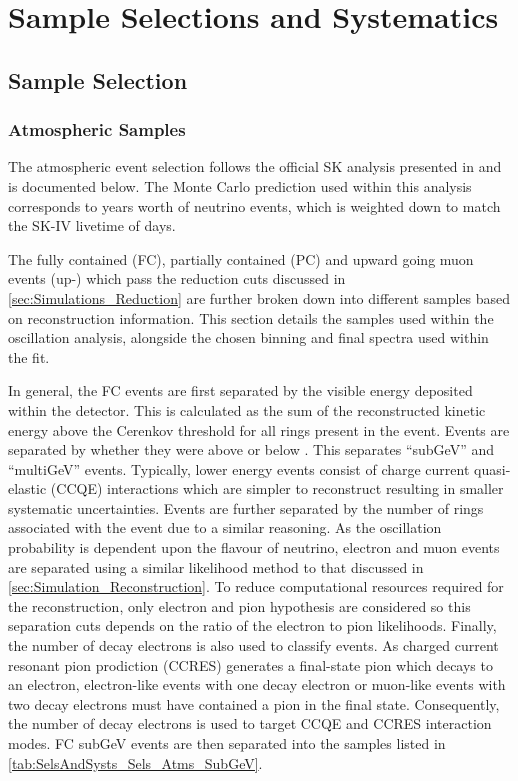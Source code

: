 \chapter{Sample Selections and Systematics}
\label{chap:SelsAndSysts}

\section{Sample Selection}
\label{sec:SelsAndSysts_Sels}

\subsection{Atmospheric Samples}
\label{sec:SelsAndSysts_Sels_Atms}

The atmospheric event selection follows the official SK analysis presented in \cite{Jiang2019-iw} and is documented below. The Monte Carlo prediction used within this analysis corresponds to  years worth of neutrino events, which is weighted down to match the SK-IV livetime of  days.

The fully contained (FC), partially contained (PC) and upward going muon events (up-\quickmath{\mu}) which pass the reduction cuts discussed in \autoref{sec:Simulations_Reduction} are further broken down into different samples based on reconstruction information. This section details the samples used within the oscillation analysis, alongside the chosen binning and final spectra used within the fit.

In general, the FC events are first separated by the visible energy deposited within the detector. This is calculated as the sum of the reconstructed kinetic energy above the Cerenkov threshold for all rings present in the event. Events are separated by whether they were above or below . This separates ``subGeV'' and ``multiGeV'' events. Typically, lower energy events consist of charge current quasi-elastic (CCQE) interactions which are simpler to reconstruct resulting in smaller systematic uncertainties. Events are further separated by the number of rings associated with the event due to a similar reasoning. As the oscillation probability is dependent upon the flavour of neutrino, electron and muon events are separated using a similar likelihood method to that discussed in \autoref{sec:Simulation_Reconstruction}. To reduce computational resources required for the reconstruction, only electron and pion hypothesis are considered so this separation cuts depends on the ratio of the electron to pion likelihoods. Finally, the number of decay electrons is also used to classify events. As charged current resonant pion prodiction (CCRES) generates a final-state pion which decays to an electron, electron-like events with one decay electron or muon-like events with two decay electrons must have contained a pion in the final state. Consequently, the number of decay electrons is used to target CCQE and CCRES interaction modes. FC subGeV events are then separated into the samples listed in \autoref{tab:SelsAndSysts_Sels_Atms_SubGeV}.

